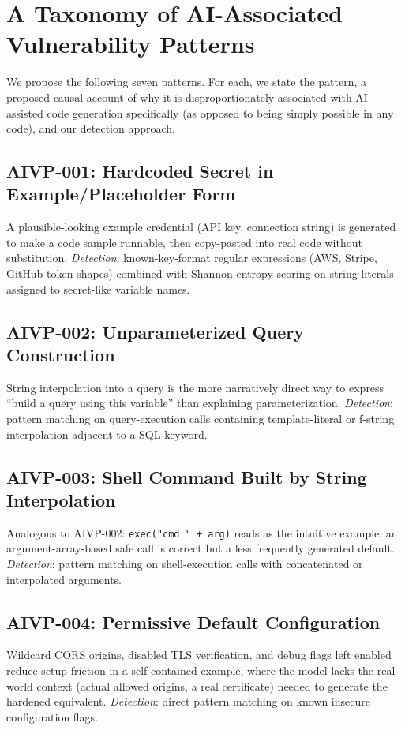 \documentclass[11pt]{article}
\begin{document}
\section{A Taxonomy of AI-Associated Vulnerability Patterns}
\label{sec:taxonomy}

We propose the following seven patterns. For each, we state the pattern,
a proposed causal account of why it is disproportionately associated with
AI-assisted code generation specifically (as opposed to being simply
possible in any code), and our detection approach.

\subsection*{AIVP-001: Hardcoded Secret in Example/Placeholder Form}
A plausible-looking example credential (API key, connection string) is
generated to make a code sample runnable, then copy-pasted into real code
without substitution. \emph{Detection}: known-key-format regular
expressions (AWS, Stripe, GitHub token shapes) combined with Shannon
entropy scoring on string literals assigned to secret-like variable names.

\subsection*{AIVP-002: Unparameterized Query Construction}
String interpolation into a query is the more narratively direct way to
express ``build a query using this variable'' than explaining
parameterization. \emph{Detection}: pattern matching on query-execution
calls containing template-literal or f-string interpolation adjacent to a
SQL keyword.

\subsection*{AIVP-003: Shell Command Built by String Interpolation}
Analogous to AIVP-002: \texttt{exec("cmd " + arg)} reads as the intuitive
example; an argument-array-based safe call is correct but a less
frequently generated default. \emph{Detection}: pattern matching on
shell-execution calls with concatenated or interpolated arguments.

\subsection*{AIVP-004: Permissive Default Configuration}
Wildcard CORS origins, disabled TLS verification, and debug flags left
enabled reduce setup friction in a self-contained example, where the
model lacks the real-world context (actual allowed origins, a real
certificate) needed to generate the hardened equivalent.
\emph{Detection}: direct pattern matching on known insecure configuration
flags.
\end{document}
